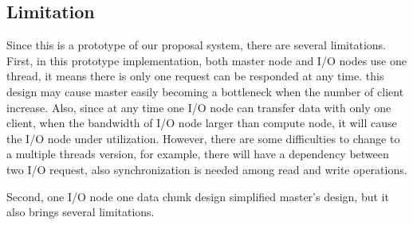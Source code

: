 \subsection{Limitation}
Since this is a prototype of our proposal system, there are several limitations.
First, in this prototype implementation, both master node and I/O nodes use one thread, it means
there is only one request can be responded at any time.
this design may cause master easily becoming a bottleneck when the number of client increase.
Also, since at any time one I/O node can transfer data with only one client, when the bandwidth of
I/O node larger than compute node, it will cause the I/O node under utilization.
However, there are some difficulties to change to a multiple threads version, for example, there
will have a dependency between two I/O request, also synchronization is needed among read and write
operations.

Second, one I/O node one data chunk design simplified master's design, but it also brings several
limitations. 
